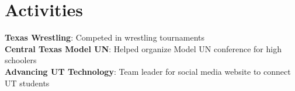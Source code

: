 \documentclass[letterpaper,11pt]{article}
\begin{document}
\section{Activities}
 \begin{itemize}[leftmargin=0.15in, label={}]
    \small{\item{
     \textbf{Texas Wrestling}{: Competed in wrestling tournaments} \\
     \textbf{Central Texas Model UN}{: Helped organize Model UN conference for high schoolers} \\
     \textbf{Advancing UT Technology}{: Team leader for social media website to connect UT students} \\
    }}
 \end{itemize}


\end{document}
